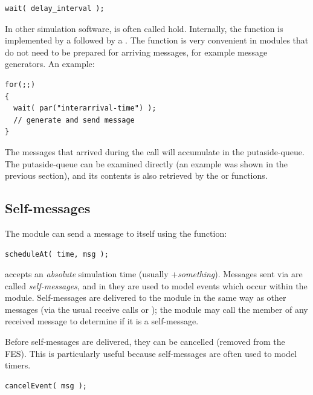 \begin{Verbatim}
wait( delay_interval );
\end{Verbatim}

In other simulation software,  is often called hold.
Internally, the  function is implemented by a
 followed by a . The
 function is very convenient in modules that do not need
to be prepared for arriving messages, for example message generators.
An example:

\begin{Verbatim}
for(;;)
{
  wait( par("interarrival-time") );
  // generate and send message
}
\end{Verbatim}

The messages that arrived during the  call will
accumulate in the putaside-queue. The putaside-queue can be examined
directly (an example was shown in the previous section), and its
contents is also retrieved by the  or
 functions.




\subsection{Self-messages}
\label{sec:ch-sim-lib:self-messages}

The module can send a message to itself using the
 function:

\begin{Verbatim}
scheduleAt( time, msg );
\end{Verbatim}

 accepts an \textit{absolute} simulation time
(usually +\textit{something}).  Messages sent via
 are called \textit{self-messages}, and in {\opp}
they are used to model events which occur within the module.
Self-messages are delivered to the module in the same way as other
messages (via the usual receive calls or ); the
module may call the  member of any received
message to determine if it is a self-message.


Before self-messages are delivered, they can be
cancelled
(removed from the FES). This is particularly useful because
self-messages are often used to model timers.

\begin{Verbatim}
cancelEvent( msg );
\end{Verbatim}


